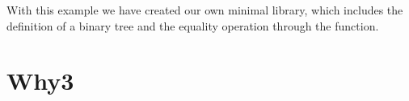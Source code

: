 With this example we have created our own minimal  library, which includes the definition of a binary tree and the equality 
operation through the  function.





\section{Why3}
\label{sec:Why3}

